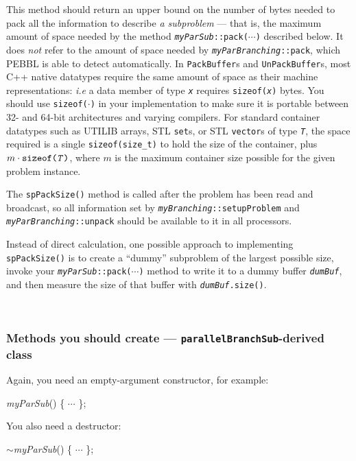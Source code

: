  This method should return an upper bound on
the number of bytes needed to pack all the information to describe
\emph{a subproblem} --- that is, the maximum amount of space needed by
the method \texttt{\emph{myParSub}::pack($\cdots$)} described below.
It does \emph{not} refer to the amount of space needed by
\texttt{\emph{myParBranching}::pack}, which PEBBL is able to detect
automatically. In \texttt{PackBuffer}s and \texttt{UnPackBuffer}s,
most C++ native datatypes require the same amount of space as their
machine representations: \emph{i.e} a data member of type
\texttt{\emph{x}} requires \texttt{sizeof(\emph{x})} bytes.  You
should use \texttt{sizeof($\cdot$)} in your implementation to make
sure it is portable between 32- and 64-bit architectures and varying
compilers.  For standard container datatypes such as 
UTILIB arrays, STL \texttt{set}s, or STL
\texttt{vector}s of type \texttt{\emph{T}}, the space required is a single
\texttt{sizeof(size\_t)} to hold the size of the container, plus
$m\cdot\text{\texttt{sizeof(\emph{T})}}$, where $m$ is the maximum
container size possible for the given problem instance.

The \texttt{spPackSize()} method is
called after the problem has been read and broadcast, so all
information set by \texttt{\emph{myBranching}::setupProblem} and
\texttt{\emph{myParBranching}::unpack} should be available to it in all
processors.

Instead of direct calculation, one possible approach to implementing
\texttt{spPackSize()} is to create a ``dummy'' subproblem of the largest
possible size, invoke your \texttt{\emph{myParSub}::pack($\cdots$)}
method to write it to a dummy buffer \texttt{\emph{dumBuf}}, and then measure
the size of that buffer with \texttt{\emph{dumBuf}.size()}.

~

\subsubsection{Methods you should create ---
  \texttt{parallelBranchSub}-derived class}
\label{sec:parsubmethods}
Again, you need an empty-argument constructor, for example:
\begin{codeblock}
\emph{myParSub}() \{  $\cdots$ \}; \\
\end{codeblock}

You also need a destructor:
\begin{codeblock}
$\sim$\emph{myParSub}() \{ $\cdots$ \}; \\
\end{codeblock}

